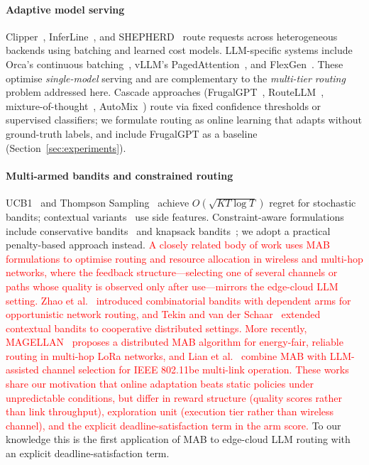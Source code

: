 \documentclass[final,3p,twocolumn,authoryear]{elsarticle}
\newcommand{\rev}[1]{\textcolor{red}{#1}}
\theoremstyle{plain}
\theoremstyle{definition}
\begin{document}
\paragraph{Adaptive model serving}
Clipper~\citep{crankshaw2017clipper}, InferLine~\citep{crankshaw2020inferline}, and SHEPHERD~\citep{zhang2023shepherd} route requests across heterogeneous backends using batching and learned cost models. LLM-specific systems include Orca's continuous batching~\citep{yu2022orca}, vLLM's PagedAttention~\citep{kwon2023vllm}, and FlexGen~\citep{sheng2023flexgen}. These optimise \emph{single-model} serving and are complementary to the \emph{multi-tier routing} problem addressed here. Cascade approaches (FrugalGPT~\citep{chen2023frugalgpt}, RouteLLM~\citep{ong2024routellm}, mixture-of-thought~\citep{yue2023large}, AutoMix~\citep{aggarwal2024automix}) route via fixed confidence thresholds or supervised classifiers; we formulate routing as online learning that adapts without ground-truth labels, and include FrugalGPT as a baseline (Section~\ref{sec:experiments}).

\paragraph{Multi-armed bandits and constrained routing}
UCB1~\citep{auer2002finite} and Thompson Sampling~\citep{thompson1933likelihood,russo2018tutorial} achieve $O(\sqrt{KT\log T})$ regret for stochastic bandits; contextual variants~\citep{li2010contextual,riquelme2018deep} use side features. Constraint-aware formulations include conservative bandits~\citep{wu2016conservative} and knapsack bandits~\citep{badanidiyuru2018bandits}; we adopt a practical penalty-based approach instead.
\rev{A closely related body of work uses MAB formulations to optimise routing and resource allocation in wireless and multi-hop networks, where the feedback structure---selecting one of several channels or paths whose quality is observed only after use---mirrors the edge-cloud LLM setting. Zhao et al.~\citep{zhao2011mabrouting} introduced combinatorial bandits with dependent arms for opportunistic network routing, and Tekin and van der Schaar~\citep{tekin2015distributed} extended contextual bandits to cooperative distributed settings. More recently, MAGELLAN~\citep{scarvaglieri2024magellan} proposes a distributed MAB algorithm for energy-fair, reliable routing in multi-hop LoRa networks, and Lian et al.~\citep{lian2025multilink} combine MAB with LLM-assisted channel selection for IEEE 802.11be multi-link operation. These works share our motivation that online adaptation beats static policies under unpredictable conditions, but differ in reward structure (quality scores rather than link throughput), exploration unit (execution tier rather than wireless channel), and the explicit deadline-satisfaction term in the arm score.}
To our knowledge this is the first application of MAB to edge-cloud LLM routing with an explicit deadline-satisfaction term.
\end{document}
